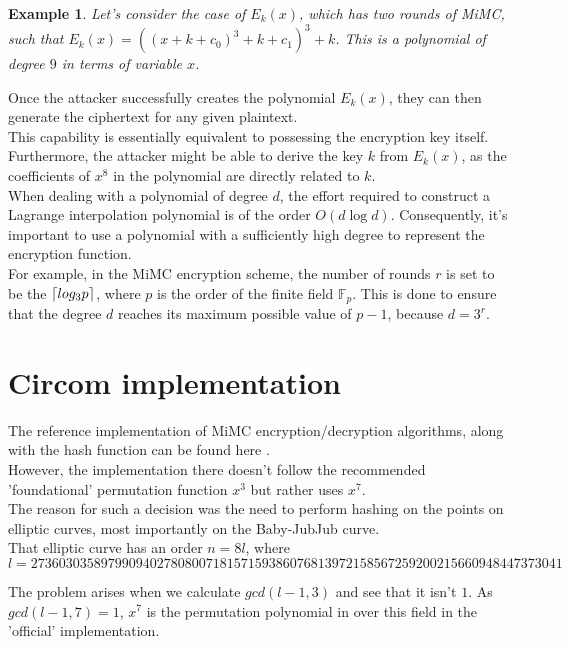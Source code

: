 \documentclass[letterpaper, bothsides, 12pt]{article} %
\DeclarePairedDelimiter\ceil{\lceil}{\rceil}
\newtheorem{example}{Example}
\begin{document}
\begin{example}
    Let's consider the case of $E_k(x)$, which has two rounds of MiMC, such that $E_k(x) = ((x + k + c_0) ^ 3 + k + c_1)^3 + k$.
    This is a polynomial of degree $9$ in terms of variable $x$. 
\end{example}
Once the attacker successfully creates the polynomial $E_k(x)$, they can then generate the ciphertext for any given plaintext. \\
This capability is essentially equivalent to possessing the encryption key itself. Furthermore, the attacker might be able to derive the key $k$ from $E_k(x)$, as the coefficients of $x^8$ in the polynomial are directly related to $k$. \\

When dealing with a polynomial of degree $d$, the effort required to construct a Lagrange interpolation polynomial is of the order $O(d\log d)$. Consequently, it's important to use a polynomial with a sufficiently high degree to represent the encryption function. \\

For example, in the MiMC encryption scheme, the number of rounds $r$ is set to be the $\ceil*{log_3 p}$, where $p$ is the order of the finite field $\mathbb{F}_p$. This is done to ensure that the degree $d$ reaches its maximum possible value of $p-1$, because $d = 3^r$.

\section{Circom implementation}

The reference implementation of MiMC encryption/decryption algorithms, along with the hash function can be found here \cite{circomlib}. \\

However, the implementation there doesn't follow the recommended 'foundational' permutation function $x^3$ but rather uses $x^7$. \\

The reason for such a decision was the need to perform hashing on the points on elliptic curves, most importantly on the Baby-JubJub curve.\\ 

That elliptic curve has an order $n = 8l$, where $$l = 2736030358979909402780800718157159386076813972158567259200215660948447373041$$

The problem arises when we calculate $gcd(l-1, 3)$ and see that it isn't $1$. As $gcd(l-1, 7) = 1$,  $x^7$ is the permutation polynomial in over this field in the 'official' implementation.



\end{document}
